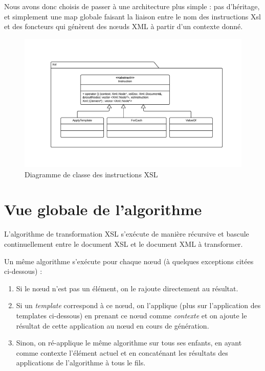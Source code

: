 Nous avons donc choisis de passer à une architecture plus simple : pas d'héritage, et simplement une map globale faisant la liaison entre le nom des instructions Xsl
et des foncteurs qui génèrent des nœuds XML à partir d'un contexte donné.

\begin{landscape}
\begin{figure}[h!]
    \centering
    \includegraphics[width=\linewidth]{images/xsl-uml.pdf}
    \caption{Diagramme de classe des instructions XSL}
    \label{xslClassDiagram}
\end{figure}
\end{landscape}


\section{Vue globale de l'algorithme}

L'algorithme de transformation XSL s’exécute de manière récursive et bascule continuellement entre le document XSL et le document XML à transformer.

Un même algorithme s'exécute pour chaque nœud (à quelques exceptions citées ci-dessous) :

\begin{enumerate}
    \item Si le nœud n'est pas un élément, on le rajoute directement au résultat.
    \item Si un \textit{template} correspond à ce nœud, on l'applique (plus sur l'application des templates ci-dessous) en prenant ce nœud comme \textit{contexte} et on ajoute le résultat de cette application au nœud en cours de génération.
    \item Sinon, on ré-applique le même algorithme sur tous ses enfants, en ayant comme contexte l'élément actuel et en concaténant les résultats des applications de l'algorithme à tous le fils.
\end{enumerate}

